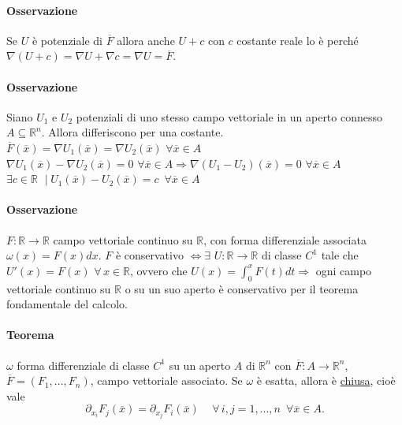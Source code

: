 \documentclass{article}
\newcommand{\R}{\mathbb{R}}
\begin{document}
\paragraph{Osservazione}
Se $U$ è potenziale di $\overline{F}$ allora anche $U+c$ con $c$ costante reale lo è perché $\nabla (U+c)=\nabla U+\nabla c= \nabla U = \overline{F}$.

\paragraph{Osservazione}
Siano $U_1$ e $U_2$ potenziali di uno stesso campo vettoriale in un aperto connesso $A \subseteq \R^n$. Allora differiscono per una costante. $\overline{F} (\overline{x})=\nabla U_1 (\overline{x})=\nabla U_2(\overline{x})\,\, \forall \overline{x}\in A $\\
$\nabla U_1(\overline{x})-\nabla U_2(\overline{x})=0\,\,\forall \overline{x}\in A \Rightarrow \nabla(U_1-U_2)(\overline{x})=0 \,\, \forall \overline{x}\in A$\\
$\exists c \in \R \,\, \mid U_1(\overline{x}) - U_2(\overline{x}) = c \,\,\, \forall \overline{x}\in A$

\paragraph{{Osservazione}}
$F:\R\rightarrow \R$ campo vettoriale continuo su $\R$, con forma differenziale associata $\omega(x)=F(x)dx$. $F$ è conservativo $\Leftrightarrow \exists \,\, U : \R \rightarrow \R$ di classe $C^1$ tale che $U'(x)=F(x)\,\, \forall \, x \in \R$, ovvero che $U(x)=\int_0^xF(t)dt \Rightarrow$ ogni campo vettoriale continuo su $\R$ o su un suo aperto è conservativo per il teorema fondamentale del calcolo.

\paragraph{{Teorema}}
$\omega$ forma differenziale di classe $C^1$ su un aperto $A$ di $\R^n$ con $\overline{F}:A \rightarrow \R^n$,  $\overline{F}=(F_1,...,F_n)$, campo vettoriale associato. Se $\omega$ è esatta, allora è \underline{chiusa}, cioè vale
\begin{equation*}
    \partial_{x_i}F_j(\overline{x})=\partial_{x_j}F_i(\overline{x})\,\,\,\,\,\,\,\forall \, i,j=1,...,n\,\,\, \forall \overline{x}\in A.
\end{equation*}
\end{document}

